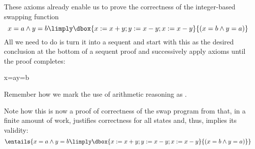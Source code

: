 \documentclass[11pt,twoside]{scrartcl}
\begin{document}
These axioms already enable us to prove the correctness of the integer-based swapping function
\[
{x=a\land y=b\limply\dbox{x:=x+y; y:=x-y; x:=x-y}{(x=b\land y=a)}}
\]
All we need to do is turn it into a sequent and start with this as the desired conclusion at the bottom of a sequent proof and successively apply axioms until the proof completes:
\begin{sequentdeduction}[array]
{\lsequent{} {x=a\land y=b\limply{}}}
\end{sequentdeduction}
Remember how we mark the use of arithmetic reasoning as .

Note how this is now a proof of correctness of the swap program from  that, in a finite amount of work, justifies correctness for all states and, thus, implies its validity:
\[
\entails {x=a\land y=b\limply\dbox{x:=x+y; y:=x-y; x:=x-y}{(x=b\land y=a)}}
\]
\end{document}

